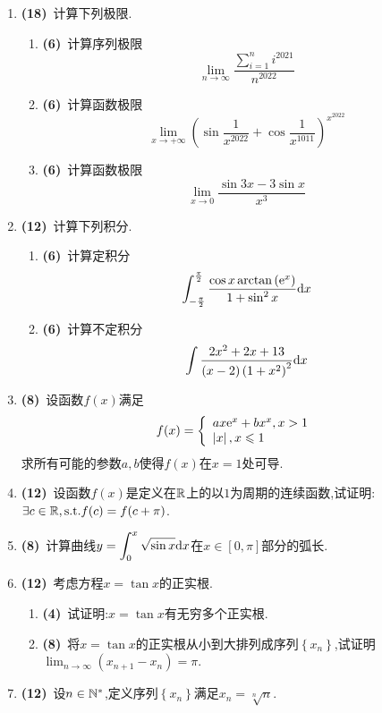 \documentclass{ctexart}
\begin{document}
\begin{enumerate}[leftmargin=*,label=\textbf{\arabic*.}]
    \item \textbf{(18)}\ 计算下列极限.
        \begin{enumerate}[label=\textbf{(\arabic*)}]
            \item \textbf{(6)}\ 计算序列极限$$\lim_{n\to\infty}\dfrac{\sum_{i=1}^{n}i^{2021}}{n^{2022}}$$
            \item \textbf{(6)}\ 计算函数极限$$\lim_{x\to+\infty}\left(\sin\dfrac{1}{x^{2022}}+\cos\dfrac{1}{x^{1011}}\right)^{x^{2022}}$$
            \item \textbf{(6)}\ 计算函数极限$$\lim_{x\to0}\dfrac{\sin3x-3\sin x}{x^3}$$
        \end{enumerate}
    \item \textbf{(12)}\ 计算下列积分.
        \begin{enumerate}[label=\textbf{(\arabic*)}]
            \item \textbf{(6)}\ 计算定积分$$\int_{-\frac{\pi}{2}}^{\frac{\pi}{2}}\dfrac{\cos x\arctan\left(\mathrm{e}^x\right)}{1+\sin^2x}\mathrm{d} x$$
            \item \textbf{(6)}\ 计算不定积分$$\int\dfrac{2x^2+2x+13}{(x-2)\left(1+x^2\right)^2}\mathrm{d} x$$
        \end{enumerate}
    \item \textbf{(8)}\ 设函数$f(x)$满足$$f(x)=\left\{\begin{array}{l}ax\mathrm{e}^x+bx^x,x>1\\\left|x\right|,x\leqslant1\end{array}\right.$$
        求所有可能的参数$a,b$使得$f(x)$在$x=1$处可导.
    \item \textbf{(12)}\ 设函数$f(x)$是定义在$\mathbb{R}$上的以$1$为周期的连续函数,试证明:$\exists c\in\mathbb{R},\text{s.t.} f(c)=f(c+\pi)$.
    \item \textbf{(8)}\ 计算曲线$\displaystyle y=\int_0^x\sqrt{\sin x}\mathrm{d} x$在$x\in[0,\pi]$部分的弧长.
    \item \textbf{(12)}\ 考虑方程$x=\tan x$的正实根.
        \begin{enumerate}[label=\textbf{(\arabic*)}]
            \item \textbf{(4)}\ 试证明:$x=\tan x$有无穷多个正实根.
            \item \textbf{(8)}\ 将$x=\tan x$的正实根从小到大排列成序列$\left\{x_n\right\}$,试证明$\displaystyle\lim_{n\to\infty}\left(x_{n+1}-x_n\right)=\pi$.
        \end{enumerate}
    \item \textbf{(12)}\ 设$n\in\mathbb{N}^*$,定义序列$\left\{x_n\right\}$满足$x_n=\sqrt[n]{n}$.

\end{enumerate}
\end{document}
